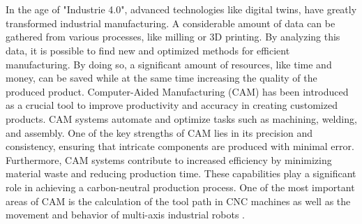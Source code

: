 \documentclass[ZLstudentexpose%
              ,optBiber%
              ,optEnglish%
              ,10pt
              ]{ZLlatex}%
\begin{document}
%
\renewcommand{\ZLlangChair}{\ZLlangGerEng{Name des Lehrstuhls (deutsch)}{Institute for Machine Tools and Industrial Management}}%
%
%

%
\section{}%


In the age of "Industrie 4.0", advanced technologies like digital twins, have greatly transformed industrial manufacturing. A considerable amount of data can be gathered from various processes, like milling or 3D printing. By analyzing this data, it is possible to find new and optimized methods for efficient manufacturing. By doing so, a significant amount of resources, like time and money, can be saved while at the same time increasing the quality of the produced product.\newline
Computer-Aided Manufacturing (CAM) has been introduced as a crucial tool to improve productivity and accuracy in creating customized products. CAM systems automate and optimize tasks such as machining, welding, and assembly. One of the key strengths of CAM lies in its precision and consistency, ensuring that intricate components are produced with minimal error. Furthermore, CAM systems contribute to increased efficiency by minimizing material waste and reducing production time. These capabilities play a significant role in achieving a carbon-neutral production process. One of the most important areas of CAM is the calculation of the tool path in CNC machines as well as the movement and behavior of multi-axis industrial robots \cite{Pan}. \newline
\end{document}
